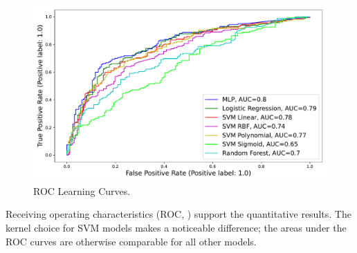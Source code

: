 



\begin{figure}[ht]
\centering
\includegraphics[width=8.cm]{plots/roccurves.pdf}
\caption{ROC Learning Curves.}

\label{fig:roc}
\end{figure}



Receiving operating characteristics (ROC, ) support the quantitative results. The kernel choice for SVM models makes a noticeable difference; the areas under the ROC curves are otherwise comparable for all other models.

